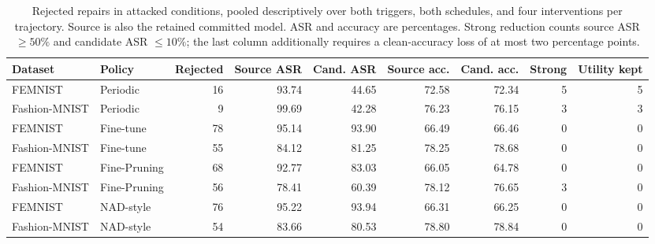\begin{table}[t]
\caption{Rejected repairs in attacked conditions, pooled descriptively over both triggers, both schedules, and four interventions per trajectory. Source is also the retained committed model. ASR and accuracy are percentages. Strong reduction counts source ASR $\geq50\%$ and candidate ASR $\leq10\%$; the last column additionally requires a clean-accuracy loss of at most two percentage points.}
\label{tab:candidates}
\centering\small\begin{tabular}{llrrrrrrr}
\toprule
Dataset & Policy & Rejected & Source ASR & Cand. ASR & Source acc. & Cand. acc. & Strong & Utility kept \\
\midrule
FEMNIST & Periodic & 16 & 93.74 & 44.65 & 72.58 & 72.34 & 5 & 5 \\
Fashion-MNIST & Periodic & 9 & 99.69 & 42.28 & 76.23 & 76.15 & 3 & 3 \\
FEMNIST & Fine-tune & 78 & 95.14 & 93.90 & 66.49 & 66.46 & 0 & 0 \\
Fashion-MNIST & Fine-tune & 55 & 84.12 & 81.25 & 78.25 & 78.68 & 0 & 0 \\
FEMNIST & Fine-Pruning & 68 & 92.77 & 83.03 & 66.05 & 64.78 & 0 & 0 \\
Fashion-MNIST & Fine-Pruning & 56 & 78.41 & 60.39 & 78.12 & 76.65 & 3 & 0 \\
FEMNIST & NAD-style & 76 & 95.22 & 93.94 & 66.31 & 66.25 & 0 & 0 \\
Fashion-MNIST & NAD-style & 54 & 83.66 & 80.53 & 78.80 & 78.84 & 0 & 0 \\
\bottomrule\end{tabular}
\end{table}
